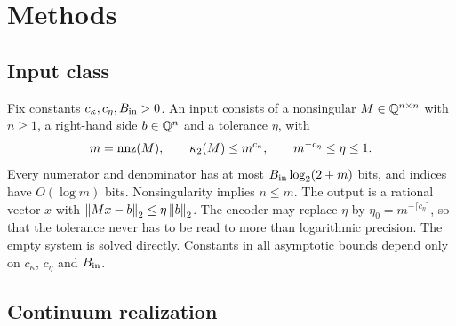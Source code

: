 \section{Methods}

\subsection{Input class}

Fix constants $c_\kappa,c_\eta,B_{\rm in}>0$. An input consists of a nonsingular
$M\in\mathbb Q^{n\times n}$ with $n\ge1$, a right-hand side $b\in\mathbb Q^n$ and a tolerance $\eta$, with
\begin{equation}
 m=\operatorname{nnz}(M),\qquad \kappa_2(M)\le m^{c_\kappa},\qquad m^{-c_\eta}\le\eta\le1.
 \label{eq:methods-input}
\end{equation}
Every numerator and denominator has at most $B_{\rm in}\log_2(2+m)$ bits, and
indices have $O(\log m)$ bits. Nonsingularity implies $n\le m$. The output is a
rational vector $x$ with $\left\lVert Mx-b\right\rVert_2\le\eta\left\lVert b\right\rVert_2$. The encoder may
replace $\eta$ by $\eta_0=m^{-\lceil c_\eta\rceil}$, so that the tolerance never has to be
read to more than logarithmic precision. The empty system is solved directly.
Constants in all asymptotic bounds depend only on $c_\kappa$, $c_\eta$ and $B_{\rm in}$.

\subsection{Continuum realization}

